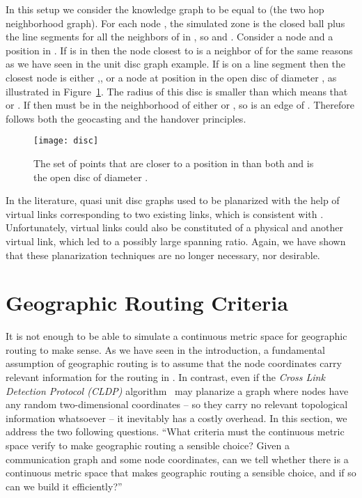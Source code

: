 \documentclass{article}
\begin{document}
In this setup we consider the knowledge graph  to be equal to  (the two hop neighborhood graph). For each node , the simulated zone  is the closed ball  plus the line segments  for all the neighbors  of  in , so  and .
Consider a node  and a position  in . If  is in  then the node closest to  is a neighbor of  for the same reasons as we have seen in the unit disc graph example. If  is on a line segment  then the closest node  is either ,, or a node at position  in the open disc of diameter , as illustrated in Figure~\ref{fig_disc}. The radius of this disc is smaller than  which means that  or . If  then  must be in the neighborhood of either  or , so  is an edge of . Therefore  follows both the geocasting and the handover principles.

\begin{figure}[h]
\begin{center}
\texttt{[image: disc]}
\caption{The set of points that are closer to a position in  than both  and  is the open disc of diameter .}
\label{fig_disc}
\end{center}
\end{figure}

In the literature, quasi unit disc graphs used to be planarized with the help of virtual links corresponding to two existing links, which is consistent with . Unfortunately, virtual links could also be constituted of a physical and another virtual link, which led to a possibly large spanning ratio. Again, we have shown that these planarization techniques are no longer necessary, nor desirable.

\section{Geographic Routing Criteria}
\label{sec_criteria}
It is not enough to be able to simulate a continuous metric space for geographic routing to make sense. As we have seen in the introduction, a fundamental assumption of geographic routing is to assume that the node coordinates carry relevant information for the routing in . In contrast, even if the {\em Cross Link Detection Protocol (CLDP)} algorithm~\cite{bib_cldp} may planarize a graph where nodes have any random two-dimensional coordinates -- so they carry no relevant topological information whatsoever -- it inevitably has a costly overhead.
In this section, we address the two following questions.
``What criteria must the continuous metric space verify to make geographic routing a sensible choice? Given a communication graph and some node coordinates, can we tell whether there is a continuous metric space that makes geographic routing a sensible choice, and if so can we build it efficiently?''
\end{document}
